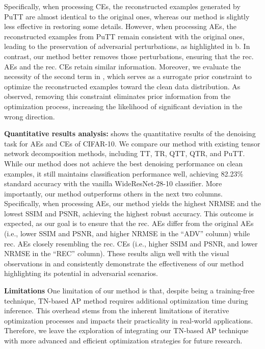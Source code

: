 Specifically, when processing CEs, the reconstructed examples generated by PuTT are almost identical to the original ones, whereas our method is slightly less effective in restoring some details. However, when processing AEs, the reconstructed examples from PuTT remain consistent with the original ones, leading to the preservation of adversarial perturbations, as highlighted in b. In contrast, our method better removes those perturbations, ensuring that the rec. AEs and the rec. CEs retain similar information. Moreover, we evaluate the necessity of the second term in , which serves as a surrogate prior constraint to optimize the reconstructed examples toward the clean data distribution. As observed, removing this constraint eliminates prior information from the optimization process, increasing the likelihood of significant deviation in the wrong direction.

\textbf{Quantitative results analysis:}  shows the quantitative results of the denoising task for AEs and CEs of CIFAR-10. We compare our method with existing tensor network decomposition methods, including TT, TR, QTT, QTR, and PuTT.
While our method does not achieve the best denoising performance on clean examples, it still maintains classification performance well, achieving 82.23\% standard accuracy with the vanilla WideResNet-28-10 classifier. More importantly, our method outperforms others in the next two columns. Specifically, when processing AEs, our method yields the highest NRMSE and the lowest SSIM and PSNR, achieving the highest robust accuracy.
This outcome is expected, as our goal is to ensure that the rec. AEs differ from the original AEs (i.e., lower SSIM and PSNR, and higher NRMSE in the ``ADV'' column) while rec. AEs closely resembling the rec. CEs (i.e., higher SSIM and PSNR, and lower NRMSE in the ``REC'' column).
These results align well with the visual observations in  and consistently demonstrate the effectiveness of our method highlighting its potential in adversarial scenarios.

\textbf{Limitations} \quad One limitation of our method is that, despite being a training-free technique, TN-based AP method requires additional optimization time during inference.
This overhead stems from the inherent limitations of iterative optimization processes and impacts their practicality in real-world applications.
Therefore, we leave the exploration of integrating our TN-based AP technique with more advanced and efficient optimization strategies for future research.



